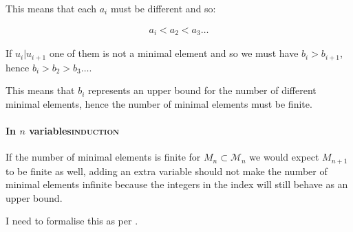 \documentclass[a4paper,11pt,twoside]{article}
\begin{document}
This means that each \(a_i\) must be different and so:

\begin{align}
a_i < a_2 < a_3 \ldots
\end{align}

If \(u_i | u_{i+1}\) one of them is not a minimal element and so we
must have \(b_i > b_{i+1}\), hence \(b_i > b_2 > b_3 \ldots\).

This means that \(b_i\) represents an upper bound for the number of
different minimal elements, hence the number of minimal elements
must be finite.



\paragraph{In \(n\) variables\hfill{}\textsc{induction}}
\label{sec:orgb0a1960}
If the number of minimal elements is finite for \(M_n \subset
     \mathcal{M}_n\) we would expect \(M_{n+1}\) to be finite as well,
adding an extra variable should not make the number of minimal
elements infinite because the integers in the index will still
behave as an upper bound.

I need to formalise this as per \cite[\S 1.1.2]{hibiGrobnerBasesStatistics2014}.
\end{document}
